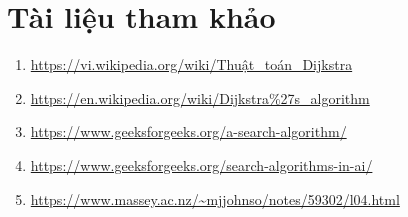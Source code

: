 \documentclass[a4paper, 12pt]{article}
\begin{document}
    \section{Tài liệu tham khảo}
    \begin{enumerate}
        \item \url{https://vi.wikipedia.org/wiki/Thuật_toán_Dijkstra}
        \item \url{https://en.wikipedia.org/wiki/Dijkstra%27s_algorithm}
        \item \url{https://www.geeksforgeeks.org/a-search-algorithm/}
        \item \url{https://www.geeksforgeeks.org/search-algorithms-in-ai/}
        \item \url{https://www.massey.ac.nz/~mjjohnso/notes/59302/l04.html}
    \end{enumerate}
\end{document}

